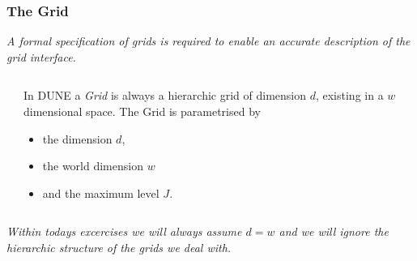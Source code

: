 \documentclass[aspectratio=169,11pt]{beamer}
\theoremstyle{definition}
\begin{document}
\begin{frame}
  \frametitle{The Grid}
  \emph{A formal specification of grids is required to enable an
  accurate description of the grid interface.}
  \begin{columns}
    \begin{column}{0.33\linewidth}
    \end{column}\hfill
    \begin{column}{0.6\linewidth}
      In DUNE a \emph{Grid} is always a hierarchic grid of dimension
      $d$, existing in a $w$ dimensional
      space. 
      The Grid is parametrised by
      \begin{itemize}
      \item the dimension $d$,
      \item the world dimension $w$
      \item and the maximum level $J$.
      \end{itemize}
    \end{column}
  \end{columns}
  \pause
  \vspace*{5mm}
  \emph{Within todays excercises we will always assume $d=w$ and we will
    ignore the hierarchic structure of the grids we deal with.}
\end{frame}
\end{document}
